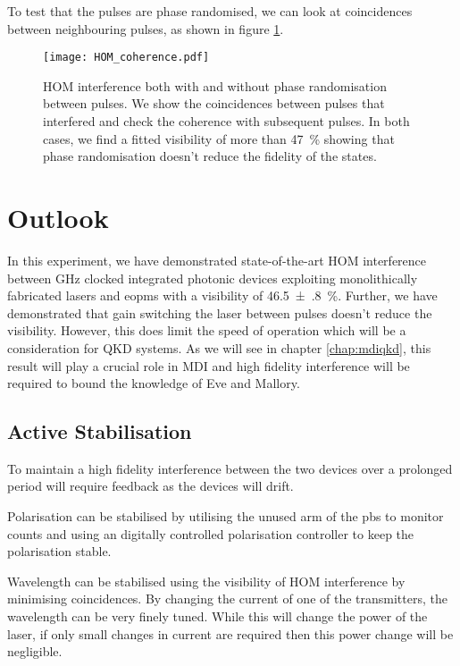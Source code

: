 To test that the pulses are phase randomised, we can look at coincidences between neighbouring pulses, as shown in figure \ref{fig:HOM_coherence}.  

\begin{figure}[tbp]
	\centering
	\texttt{[image: HOM\_coherence.pdf]}
	\caption[HOM interference with and without phase randomisation]{\ac{HOM} interference both with and without phase randomisation between pulses. We show the coincidences between pulses that interfered and check the coherence with subsequent pulses. In both cases, we find a fitted visibility of more than \SI{47}{\%} showing that phase randomisation doesn't reduce the fidelity of the states.}
	\label{fig:HOM_coherence}
\end{figure}

\section{Outlook}

In this experiment, we have demonstrated state-of-the-art \acl{HOM} interference between GHz clocked integrated photonic devices exploiting monolithically fabricated lasers and \acp{eopm} with a visibility of \SI{46.5(8)}{\%}. Further, we have demonstrated that gain switching the laser between pulses doesn't reduce the visibility. However, this does limit the speed of operation which will be a consideration for \ac{QKD} systems. As we will see in chapter \ref{chap:mdiqkd}, this result will play a crucial role in \ac{MDI} and high fidelity interference will be required to bound the knowledge of Eve and Mallory.

\subsection{Active Stabilisation}

To maintain a high fidelity interference between the two devices over a prolonged period will require feedback as the devices will drift. 

Polarisation can be stabilised by utilising the unused arm of the \ac{pbs} to monitor counts and using an digitally controlled polarisation controller to keep the polarisation stable.

Wavelength can be stabilised using the visibility of \ac{HOM} interference by minimising coincidences. By changing the current of one of the transmitters, the wavelength can be very finely tuned. While this will change the power of the laser, if only small changes in current are required then this power change will be negligible.

